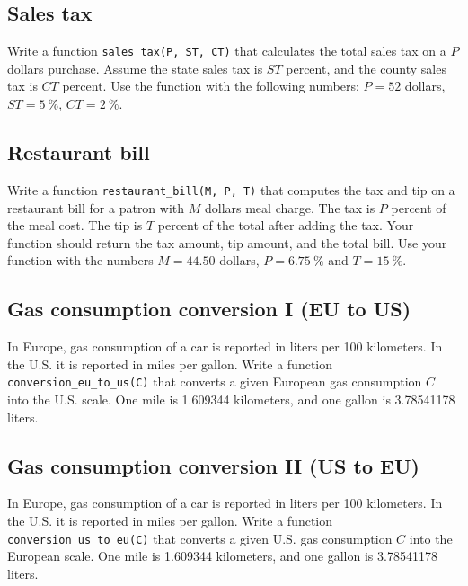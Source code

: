 
\subsection{Sales tax}

Write a function {\tt sales\_tax(P, ST, CT)} that calculates the total sales tax on a $P$ dollars purchase. 
Assume the state sales tax is $ST$ percent, and the county sales tax is $CT$ percent. Use the
function with the following numbers: $P = 52$ dollars, $ST = 5 \ \%$, $CT = 2 \ \%$.


\subsection{Restaurant bill}

Write a function {\tt restaurant\_bill(M, P, T)} 
that computes the tax and tip on a restaurant bill for a patron with 
$M$ dollars meal charge. The tax is $P$ percent of the meal cost. 
The tip is $T$ percent of the total after 
adding the tax. Your function should return the tax amount, tip amount, and the total bill. 
Use your function with the numbers $M = 44.50$ dollars, $P = 6.75 \ \%$ and $T = 15 \ \%$. 


\subsection{Gas consumption conversion I (EU to US)}

In Europe, gas consumption of a car is reported in liters per 100 kilometers. In the U.S. 
it is reported in miles per gallon. Write a function {\tt conversion\_eu\_to\_us(C)} that converts a given European 
gas consumption $C$ into the U.S. scale. One mile is 1.609344 kilometers, and one gallon is 3.78541178 liters. 


\subsection{Gas consumption conversion II (US to EU)}

In Europe, gas consumption of a car is reported in liters per 100 kilometers. In the U.S. 
it is reported in miles per gallon. Write a function {\tt conversion\_us\_to\_eu(C)} that converts a given U.S. gas 
consumption $C$ into the European scale. One mile is 1.609344 kilometers, and one gallon is 3.78541178 liters. 

